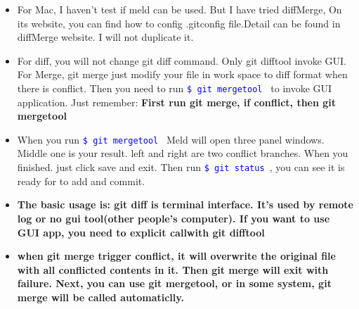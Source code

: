 \documentclass[a4paper,11pt,twoside]{book}
\newcommand{\linuxcommand}[1]{\texttt{\textcolor{blue}{\$ #1 \Pisymbol{psy}{191}}}}
\begin{document}
\begin{itemize}
\begin{enumerate}
	\end{enumerate}
	
	\begin{verbatim}       
		[diff]
		tool = meld
		[difftool]
		prompt = false
		[difftool "meld"]
		cmd = \"C:/Program Files (x86)/Meld/Meld.exe\" $LOCAL $REMOTE
		
		
		[merge]
		tool = meld
		
		[mergetool "meld"]
		keepBackup = false
		trustExitCode = false
		
		[mergetool "meld"]
		path = C:\\Program Files (x86)\\Meld\\Meld.exe
	\end{verbatim}
	
	
	
	\item For Mac, I haven't test if meld can be used. But I have tried diffMerge, On its website, you can find how to config .gitconfig file.Detail can be found in diffMerge website. I will not duplicate it.
	
	\item For diff, you will not change git diff command. Only git difftool invoke GUI. For Merge, git merge just modify your file in work space to diff format when there is conflict. Then you need to run \linuxcommand{git mergetool} to invoke GUI application.  Just remember: \textbf{First run git merge, if conflict, then git mergetool}
	
	\item When you run \linuxcommand{git mergetool} Meld will open three panel windows. Middle one is your result. left and right are two conflict branches.  When you finished. just click save and exit. Then run \linuxcommand{git status}, you can see it is ready for to add and commit. 
	
	\item \textbf{The basic usage is: git diff is terminal interface. It's used by remote log or no gui tool(other people's computer). If you want to use GUI app, you need to explicit callwith git difftool}
	
	\item \textbf{when git merge trigger conflict, it will overwrite the original  file with all conflicted contents in it. Then git merge will exit with failure. Next, you can use git mergetool, or in some system, git merge will be called automaticlly.}
	
\end{itemize}
\end{document}
